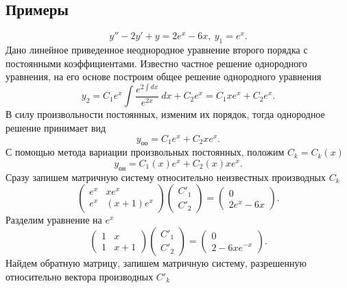     \subsection{Примеры}
        \[
            y'' - 2y' + y = 2e^x -6x, ~ y_1 = e^x.
        \]
        Дано линейное приведенное неоднородное уравнение второго порядка с постоянными коэффициентами. Известно частное решение однородного уравнения, на его основе построим общее решение однородного уравнения
        \[
            y_2 = C_1 e^x \int \dfrac{e^{2 \displaystyle \int dx}}{e^{2x}} ~ dx + C_2 e^x = C_1 xe^x + C_2 e^x.
        \]
        В силу произвольности постоянных, изменим их порядок, тогда однородное решение принимает вид
        \[
            y_\text{оо} = C_1 e^x + C_2 xe^x.
        \]
        С помощью метода вариации произвольных постоянных, положим $ C_k = C_k(x) $
        \[
            y_\text{он} = C_1(x) e^x + C_2(x) xe^x.
        \]
        Сразу запишем матричную систему относительно неизвестных производных $ C_k $
        \[
            \begin{pmatrix}
                e^x & xe^x \\
                e^x & (x + 1)e^x
            \end{pmatrix}
            \begin{pmatrix}
                C'_1 \\ C'_2
            \end{pmatrix} =
            \begin{pmatrix}
                0 \\ 2e^x - 6x
            \end{pmatrix}.
        \]
        Разделим уравнение на $ e^x $
        \[
            \begin{pmatrix}
                1 & x \\
                1 & x + 1
            \end{pmatrix}
            \begin{pmatrix}
                C'_1 \\ C'_2
            \end{pmatrix} =
            \begin{pmatrix}
                0 \\ 2 - 6xe^{- x}
            \end{pmatrix}.
        \]
        Найдем обратную матрицу, запишем матричную систему, разрешенную относительно вектора производных $ C'_k $
